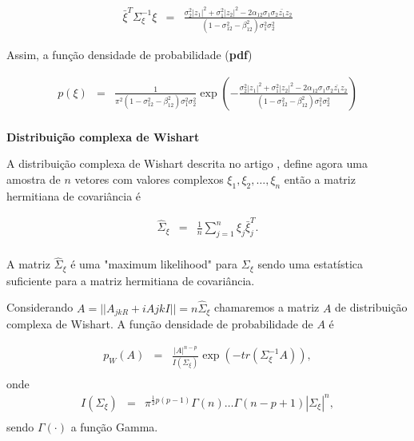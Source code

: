 \documentclass[10pt,a4paper]{article}
\begin{document}
\begin{equation}\label{sec2eqn10}
\begin{array}{ccc}
	\bar{\xi}^{T}\Sigma_{\xi}^{-1}\xi&=&\frac{\sigma_2^2|z_1|^2+\sigma_1^2|z_2|^2-2\alpha_{12}\sigma_1\sigma_2\bar{z_1}z_2}{(1 - \sigma_{12}^{2}- \beta_{12}^2)\sigma_{1}^2\sigma_{2}^2}
\end{array}
\end{equation}

Assim, a função densidade de probabilidade ({\bf pdf}) 

\begin{equation}\label{sec2eqn11}
\begin{array}{ccc}
	p(\xi)&=&\frac{1}{\pi^2(1 - \sigma_{12}^{2}- \beta_{12}^2)\sigma_{1}^2\sigma_{2}^2}\exp\left(-\frac{\sigma_2^2|z_1|^2+\sigma_1^2|z_2|^2-2\alpha_{12}\sigma_1\sigma_2\bar{z_1}z_2}{(1 - \sigma_{12}^{2}- \beta_{12}^2)\sigma_{1}^2\sigma_{2}^2}
\right)  \\
\end{array}
\end{equation}

{\bf Distribuição complexa de Wishart}

A distribuição complexa de Wishart descrita no artigo \cite{goodman1963}, define agora uma amostra de  $n$ vetores com valores complexos $\xi_1,\xi_2,\dots,\xi_n$ então a matriz hermitiana de covariância é 

\begin{equation}\label{sec2eqn12}
\begin{array}{ccc}
	\hat{\Sigma}_{\xi}&=&\frac{1}{n}\displaystyle{\sum_{j=1}^{n}\xi_j\bar{\xi}_{j}^{T}} . \\
\end{array}
\end{equation}

A matriz $\hat{\Sigma}_{\xi}$ é uma "maximum likelihood" para $\Sigma_{\xi}$ sendo uma estatística suficiente para a matriz hermitiana de covariância.

Considerando $A=||A_{jkR}+iA{jkI}||=n\hat{\Sigma}_{\xi}$ chamaremos a matriz $A$ de distribuição complexa de Wishart. A função densidade de probabilidade de $A$ é


\begin{equation}\label{sec2eqn13}
\begin{array}{ccc}
	p_W(A)&=&\frac{|A|^{n-p}}{I(\Sigma_{\xi})} \exp(-tr(\Sigma_{\xi}^{-1}A)), \\
\end{array}
\end{equation}
onde
\begin{equation}\label{sec2eqn14}
\begin{array}{ccc}
	I(\Sigma_{\xi})&=&\pi^{\frac{1}{2}p(p-1)}\Gamma(n)\dots\Gamma(n-p+1)|\Sigma_{\xi}|^n, \\
\end{array}
\end{equation}
sendo $\Gamma(\cdot)$ a função Gamma.
\end{document}
